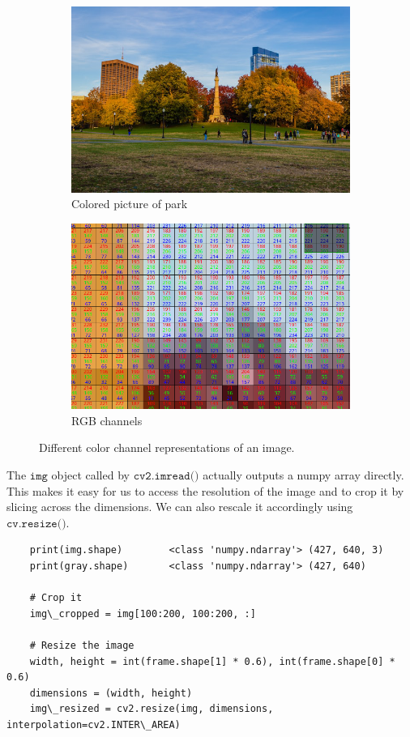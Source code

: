 \begin{figure}[H]
    \centering
    \begin{subfigure}[b]{0.45\textwidth}
    \centering
        \includegraphics[width=\textwidth]{img/Park_Full.png}
        \caption{Colored picture of park}
        \label{fig:3d}
    \end{subfigure}
    \begin{subfigure}[b]{0.45\textwidth}
    \centering
        \includegraphics[width=\textwidth]{img/Park_Cropped.png}
        \caption{RGB channels}
        \label{fig:4d}
    \end{subfigure}
    \label{fig:Park_Images}
    \caption{Different color channel representations of an image. }
  \end{figure}

  The $\texttt{img}$ object called by $\texttt{cv2.imread()}$ actually outputs a numpy array directly. This makes it easy for us to access the resolution of the image and to crop it by slicing across the dimensions. We can also rescale it accordingly using $\texttt{cv.resize()}$. 
  \begin{lstlisting}
    print(img.shape)        <class 'numpy.ndarray'> (427, 640, 3)
    print(gray.shape)       <class 'numpy.ndarray'> (427, 640)

    # Crop it 
    img\_cropped = img[100:200, 100:200, :]

    # Resize the image 
    width, height = int(frame.shape[1] * 0.6), int(frame.shape[0] * 0.6) 
    dimensions = (width, height) 
    img\_resized = cv2.resize(img, dimensions, interpolation=cv2.INTER\_AREA) 
  \end{lstlisting}

